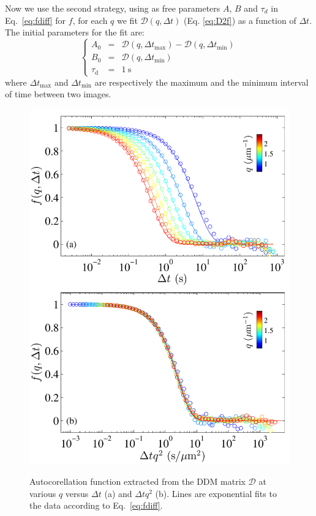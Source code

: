 \documentclass[prb,reprint,amsmath,amssymb]{revtex4-1}
\newcommand{\tg}[1]{{\color{magenta}#1}} %
\begin{document}
Now we use the second strategy, using as free parameters $A$, $B$ and $\tau_d$ in Eq.~\eqref{eq:fdiff} for $f$, for each $q$ we fit $\mathcal{D}(q, \Delta t)$ (Eq. \eqref{eq:D2f}) as a function of $\Delta t$. The initial parameters for the fit are:
\begin{equation}
\left\{
\begin{array}{rcl}
A_0 &=& \mathcal{D} (q,\Delta t_\text{max}) - \mathcal{D} (q,\Delta t_\text{min}) \\
B_0 &=& \mathcal{D} (q,\Delta t_\text{min}) \\
\tau_\text{d} &=& \SI{1}{\second}
\end{array}
\right.
\end{equation}
where $\Delta t_\text{max}$ and $\Delta t_\text{min}$ are respectively the maximum and the minimum interval of time between two images.

\begin{figure}
	\includegraphics[width=\linewidth]{ISFColloides.pdf}\\
	\caption{\tg{Autocorellation function extracted from the DDM matrix $\mathcal{D}$} at various $q$ versus $\Delta t$ (a) and $\Delta tq^2$ (b). Lines are exponential fits to the data according to Eq.~\ref{eq:fdiff}.}
	\label{ISF}
\end{figure}
\end{document}
